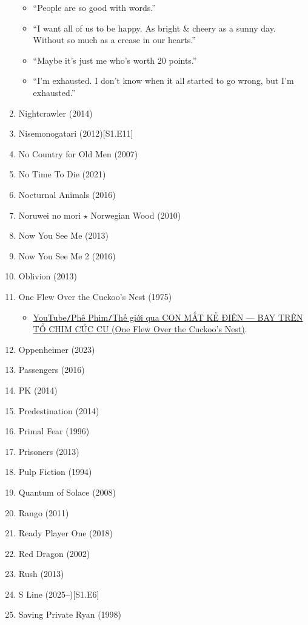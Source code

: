 \documentclass{article}
\begin{document}
\begin{enumerate}
\begin{itemize}
		\item ``People are so good with words.''
		\item ``I want all of us to be happy. As bright \& cheery as a sunny day. Without so much as a crease in our hearts.''
		\item ``Maybe it's just me who's worth 20 points.''
		\item ``I'm exhausted. I don't know when it all started to go wrong, but I'm exhausted.''
	\end{itemize}
	\item {\sc Nightcrawler} (2014)
	\item {\sc Nisemonogatari} (2012)\hfill[S1.E11]
	\item {\sc No Country for Old Men} (2007)
	\item No Time To Die (2021)
	\item {\sc Nocturnal Animals} (2016)
	\item {\sc Noruwei no mori $\star$ Norwegian Wood} (2010)
	\item {\sc Now You See Me} (2013)
	\item {\sc Now You See Me 2} (2016)
	\item {\sc Oblivion} (2013)
	\item One Flew Over the Cuckoo's Nest (1975)
	\begin{itemize}
		\item \href{https://www.youtube.com/watch?v=-FUAeLmb5wE}{YouTube{\tt/}Phê Phim{\tt/}Thế giới qua CON MẮT KẺ ĐIÊN — BAY TRÊN TỔ CHIM CÚC CU (One Flew Over the Cuckoo's Nest)}.
	\end{itemize}
	\item {\sc Oppenheimer} (2023)
	\item {\sc Passengers} (2016)
	\item {\sc PK} (2014)
	\item {\sc Predestination} (2014)
	\item {\sc Primal Fear} (1996)
	\item {\sc Prisoners} (2013)
	\item {\sc Pulp Fiction} (1994)
	\item {\sc Quantum of Solace} (2008)
	\item {\sc Rango} (2011)
	\item {\sc Ready Player One} (2018)
	\item {\sc Red Dragon} (2002)
	\item {\sc Rush} (2013)
    \item {\sc S Line} (2025--)\hfill[S1.E6]
	\item {\sc Saving Private Ryan} (1998)

\end{enumerate}
\end{document}
